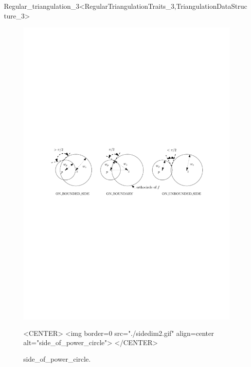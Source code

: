 \begin{ccRefClass}{Regular_triangulation_3<RegularTriangulationTraits_3,TriangulationDataStructure_3>}
\begin{figure}[htbp]
\begin{ccTexOnly}
\begin{center} 
\includegraphics{Triangulation_3_ref/sidedim2} 
\end{center}
\end{ccTexOnly}
\caption{side\_of\_power\_circle.
\label{Triangulation3-fig-sidedim2}}
\begin{ccHtmlOnly}
<CENTER>
<img border=0 src="./sidedim2.gif" align=center
alt="side_of_power_circle"> 
</CENTER>
\end{ccHtmlOnly}
\end{figure} 


\end{ccRefClass}
